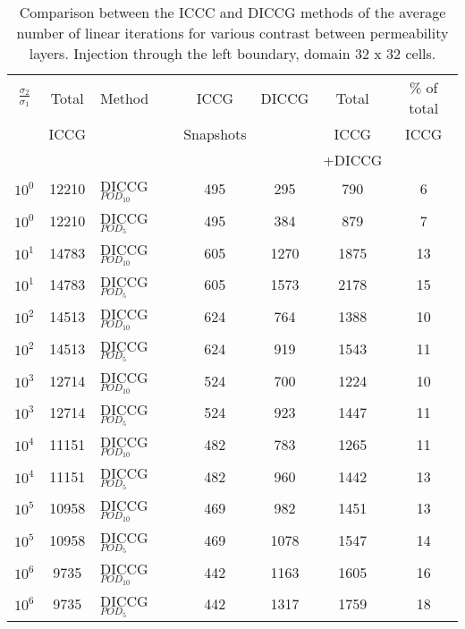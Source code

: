 \documentclass[12pt]{article}
\begin{document}
\begin{table}[!h]\centering
\begin{minipage}{1\textwidth}
 \centering
\begin{tabular}{ ||c|c||l|c|c|c|c||} 
\hline
$\frac{\sigma_2}{\sigma_1}$&Total&Method  & ICCG&DICCG &Total&\% of total\\ 
                           & ICCG     &  & Snapshots& &ICCG& ICCG\\ 
                            &     &  & & &+DICCG& \\
\hline  
$10^{0}$ &12210& DICCG$_{POD_{10}}$&495&295&790&6 \\ 
\hline  
$10^{0}$ &12210& DICCG$_{POD_{5}}$&495&384&879&7 \\ 
\hline    
$10^{1}$ &14783& DICCG$_{POD_{10}}$&605&1270&1875&13 \\ 
\hline  
$10^{1}$ &14783& DICCG$_{POD_{5}}$&605&1573&2178&15 \\ 
\hline    
$10^{2}$ &14513& DICCG$_{POD_{10}}$&624&764&1388&10 \\ 
\hline  
$10^{2}$ &14513& DICCG$_{POD_{5}}$&624&919&1543&11 \\ 
\hline  
$10^{3}$ &12714& DICCG$_{POD_{10}}$&524&700&1224&10 \\ 
\hline  
$10^{3}$ &12714& DICCG$_{POD_{5}}$&524&923&1447&11 \\ 
\hline
$10^{4}$ &11151& DICCG$_{POD_{10}}$&482&783&1265&11 \\ 
\hline  
$10^{4}$ &11151& DICCG$_{POD_{5}}$&482&960&1442&13 \\ 
\hline 
$10^{5}$ &10958& DICCG$_{POD_{10}}$&469&982&1451&13 \\ 
\hline  
$10^{5}$ &10958& DICCG$_{POD_{5}}$&469&1078&1547&14 \\ 
\hline  
$10^{6}$ &9735& DICCG$_{POD_{10}}$&442&1163&1605&16 \\ 
\hline  
$10^{6}$ &9735& DICCG$_{POD_{5}}$&442&1317&1759&18 \\ 
\hline 
\end{tabular} 
\caption{Comparison between the ICCC and DICCG methods of the average number of linear iterations for various contrast between permeability layers. Injection through the left boundary, domain 32 x 32 cells.}\label{table:liter1} 
\end{minipage}  
\end{table}  
\end{document}
